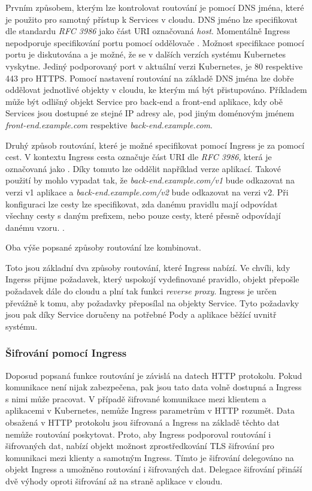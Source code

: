 Prvním způsobem, kterým lze kontrolovat routování je pomocí DNS jména, které je použito pro samotný přístup k Services v cloudu. DNS jméno lze specifikovat dle standardu \textit{RFC 3986} jako část URI označovaná \textit{host}. Momentálně Ingress nepodporuje specifikování portu pomocí oddělovače \uv{:}. Možnost specifikace pomocí portu je diskutována a je možné, že se v dalších verzích systému Kubernetes vyskytne. Jediný podporovaný port v aktuální verzi Kubernetes, je 80 respektive 443 pro HTTPS. Pomocí nastavení routování na základě DNS jména lze dobře oddělovat jednotlivé objekty v cloudu, ke kterým má být přistupováno. Příkladem může být odlišný objekt Service pro back-end a front-end aplikace, kdy obě Services jsou dostupné ze stejné IP adresy ale, pod jiným doménovým jménem \textit{front-end.example.com} respektive \textit{back-end.example.com}.

Druhý způsob routování, které je možné specifikovat pomocí Ingress je za pomocí cest. V kontextu Ingress cesta označuje část URI dle \textit{RFC 3986}, která je označovaná jako . Díky tomuto lze oddělit například verze aplikací. Takové použití by mohlo vypadat tak, že \textit{back-end.example.com/v1} bude odkazovat na verzi v1 aplikace a \textit{back-end.example.com/v2} bude odkazovat na verzi v2. Při konfiguraci lze cesty lze specifikovat, zda danému pravidlu mají odpovídat všechny cesty s daným prefixem, nebo pouze cesty, které přesně odpovídají danému vzoru. \cite{thekubernetesauthors_2022_ingress}. 

Oba výše popsané způsoby routování lze kombinovat.

Toto jsou základní dva způsoby routování, které Ingress nabízí. Ve chvíli, kdy Ingerss přijme požadavek, který uspokojí vydefinované pravidlo, objekt přepošle požadavek dále do cloudu a plní tak funkci \textit{reverse proxy}. Ingress je určen převážně k tomu, aby požadavky přeposílal na objekty Service. Tyto požadavky jsou pak díky Service doručeny na potřebné Pody a aplikace běžící uvnitř systému. %

\subsubsection{Šifrování pomocí Ingress}
Doposud popsaná funkce routování je závislá na datech HTTP protokolu. Pokud komunikace není nijak zabezpečena, pak jsou tato data volně dostupná a Ingress s nimi může pracovat. V případě šifrované komunikace mezi klientem a aplikacemi v Kubernetes, nemůže Ingress parametrům v HTTP rozumět. Data obsažená v HTTP protokolu jsou šifrovaná a Ingress na základě těchto dat nemůže routování poskytovat. Proto, aby Ingress podporoval routování i šifrovaných dat, nabízí objekt možnost zprostředkování TLS šifrování pro komunikaci mezi klienty a samotným Ingress. Tímto je šifrování delegováno na objekt Ingress a umožněno routování i šifrovaných dat. Delegace šifrování přináší dvě výhody oproti šifrování až na straně aplikace v cloudu. \cite{poulton_2022_the}

